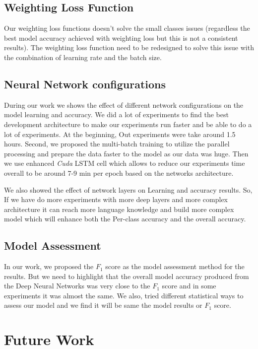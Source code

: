\subsection{Weighting Loss Function}

Our weighting loss functions doesn't solve the small classes issues (regardless the best model accuracy achieved with weighting loss but this is not a consistent results). The weighting loss function need to be redesigned to solve this issue with the combination of learning rate and the batch size.


\subsection{Neural Network configurations}

During our work we shows the effect of different network configurations on the model learning and accuracy. We did a lot of experiments to find the best development architecture to make our experiments run faster and be able to do a lot of experiments. At the beginning, Out experiments were take around 1.5 hours. Second, we proposed the multi-batch training to utilize the parallel processing and prepare the data faster to the model as our data was huge. Then we use enhanced \textit{Cuda} LSTM cell which allows to reduce our experiments time overall to be around 7-9 min per epoch based on the networks architecture. 

We also showed the effect of network layers on Learning and accuracy results. So, If we have do more experiments with more deep layers and more complex architecture it can reach more language knowledge and build more complex model which will enhance both the Per-class accuracy and the overall accuracy.

\subsection{Model Assessment}

In our work, we proposed the $F_1$ score as the model assessment method for the results. But we need to highlight that the overall model accuracy produced from the Deep Neural Networks was very close to the $F_1$ score and in some experiments it was almost the same. We also, tried different statistical ways to assess our model and we find it will be same the model results or $F_1$ score.

  \section{Future Work}








